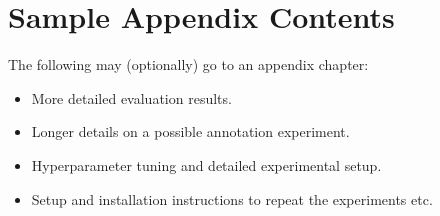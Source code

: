 \chapter{Sample Appendix Contents}
The following may (optionally) go to an appendix chapter:

\begin{itemize}
    \item More detailed evaluation results.
    \item Longer details on a possible annotation experiment.
    \item Hyperparameter tuning and detailed experimental setup.
    \item Setup and installation instructions to repeat the experiments etc.
\end{itemize}